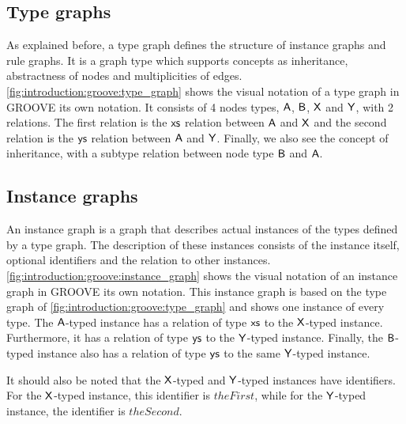 \subsection{Type graphs}
\label{subsec:introduction:groove:type_graphs}
As explained before, a type graph defines the structure of instance graphs and rule graphs. It is a graph type which supports concepts as inheritance, abstractness of nodes and multiplicities of edges. \cref{fig:introduction:groove:type_graph} shows the visual notation of a type graph in GROOVE its own notation. It consists of 4 nodes types, $\mathsf{A}$, $\mathsf{B}$, $\mathsf{X}$ and $\mathsf{Y}$, with 2 relations. The first relation is the $\mathsf{xs}$ relation between $\mathsf{A}$ and $\mathsf{X}$ and the second relation is the $\mathsf{ys}$ relation between $\mathsf{A}$ and $\mathsf{Y}$. Finally, we also see the concept of inheritance, with a subtype relation between node type $\mathsf{B}$ and $\mathsf{A}$.

\subsection{Instance graphs}
\label{subsec:introduction:groove:instance_graphs}
An instance graph is a graph that describes actual instances of the types defined by a type graph. The description of these instances consists of the instance itself, optional identifiers and the relation to other instances. \cref{fig:introduction:groove:instance_graph} shows the visual notation of an instance graph in GROOVE its own notation. This instance graph is based on the type graph of \cref{fig:introduction:groove:type_graph} and shows one instance of every type. The $\mathsf{A}$-typed instance has a relation of type $\mathsf{xs}$ to the $\mathsf{X}$-typed instance. Furthermore, it has a relation of type $\mathsf{ys}$ to the $\mathsf{Y}$-typed instance. Finally, the $\mathsf{B}$-typed instance also has a relation of type $\mathsf{ys}$ to the same $\mathsf{Y}$-typed instance.

It should also be noted that the $\mathsf{X}$-typed and $\mathsf{Y}$-typed instances have identifiers. For the $\mathsf{X}$-typed instance, this identifier is $theFirst$, while for the $\mathsf{Y}$-typed instance, the identifier is $theSecond$.